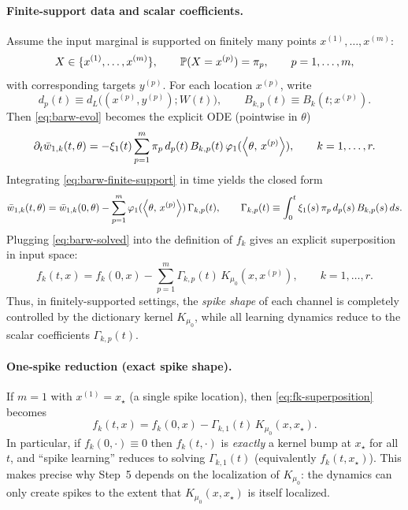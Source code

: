 \paragraph{Finite-support data and scalar coefficients.}
Assume the input marginal is supported on finitely many points $x^{(1)},\dots,x^{(m)}$:
\[
X\in\{x^{(1)},\dots,x^{(m)}\},\qquad \mathbb{P}(X=x^{(p)})=\pi_p,\qquad p=1,\dots,m,
\]
with corresponding targets $y^{(p)}$.
For each location $x^{(p)}$, write
\[
d_p(t)\equiv d_L\big((x^{(p)},y^{(p)});W(t)\big),\qquad B_{k,p}(t)\equiv B_k(t;x^{(p)}).
\]
Then \eqref{eq:barw-evol} becomes the explicit ODE (pointwise in $\theta$)
\begin{equation}\label{eq:barw-finite-support}
\partial_t \bar w_{1,k}(t,\theta)
=-\xi_1(t)\sum_{p=1}^m \pi_p\,d_p(t)\,B_{k,p}(t)\,\varphi_1(\left\langle \theta,\,x^{(p)} \right\rangle),
\qquad k=1,\dots,r.
\end{equation}
Integrating \eqref{eq:barw-finite-support} in time yields the closed form
\begin{equation}\label{eq:barw-solved}
\bar w_{1,k}(t,\theta)
=\bar w_{1,k}(0,\theta)-\sum_{p=1}^m \varphi_1(\left\langle \theta,\,x^{(p)} \right\rangle)\,\Gamma_{k,p}(t),
\qquad
\Gamma_{k,p}(t)\equiv \int_0^t \xi_1(s)\,\pi_p\,d_p(s)\,B_{k,p}(s)\,ds.
\end{equation}
Plugging \eqref{eq:barw-solved} into the definition of $f_k$ gives an explicit superposition in input space:
\begin{equation}\label{eq:fk-superposition}
f_k(t,x)=f_k(0,x)-\sum_{p=1}^m \Gamma_{k,p}(t)\,K_{\mu_0}(x,x^{(p)}),\qquad k=1,\dots,r.
\end{equation}
Thus, in finitely-supported settings, the \emph{spike shape} of each channel is completely controlled by the dictionary kernel $K_{\mu_0}$, while all learning dynamics reduce to the scalar coefficients $\Gamma_{k,p}(t)$.

\paragraph{One-spike reduction (exact spike shape).}
If $m=1$ with $x^{(1)}=x_\star$ (a single spike location), then \eqref{eq:fk-superposition} becomes
\[
f_k(t,x)=f_k(0,x)-\Gamma_{k,1}(t)\,K_{\mu_0}(x,x_\star).
\]
In particular, if $f_k(0,\cdot)\equiv 0$ then $f_k(t,\cdot)$ is \emph{exactly} a kernel bump at $x_\star$ for all $t$, and ``spike learning'' reduces to solving $\Gamma_{k,1}(t)$ (equivalently $f_k(t,x_\star)$).
This makes precise why Step~5 depends on the localization of $K_{\mu_0}$: the dynamics can only create spikes to the extent that $K_{\mu_0}(x,x_\star)$ is itself localized.

